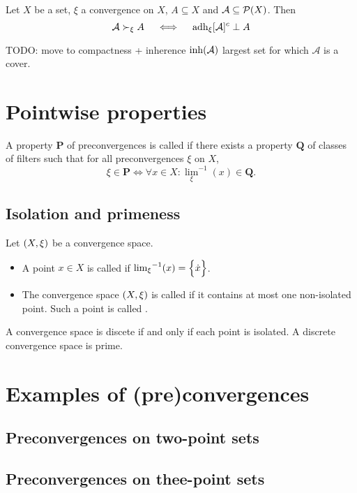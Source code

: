 \begin{proposition}
Let $X$ be a set, $\xi$ a convergence on $X$, $A\subseteq X$ and $\mathcal{A}\subseteq \operatorname{\mathcal{P}}(X)$. Then
\[ \mathcal{A} \succ_\xi A \quad\iff\quad \operatorname{adh}_\xi [\mathcal{A}]^c \perp A \]
\end{proposition}


TODO: move to compactness + inherence $\operatorname{inh}(\mathcal{A})$ largest set for which $\mathcal{A}$ is a cover.

\section{Pointwise properties}
\begin{definition}
A property $\mathbf{P}$ of preconvergences is called  if there exists a property $\mathbf{Q}$ of classes of filters such that for all preconvergences $\xi$ on $X$,
\[ \xi \in \mathbf{P} \iff \forall x\in X: {\lim_\xi}^{-1}(x) \in \mathbf{Q}. \]
\end{definition}

\subsection{Isolation and primeness}
\begin{definition}
Let $\left( X,\xi \right)$ be a convergence space.
\begin{itemize}
\item A point $x\in X$ is called  if ${\lim_\xi}^{-1}(x) = \Big\{ \dot{x} \Big\}$.
\item The convergence space $\left( X,\xi \right)$ is called  if it contains at most one non-isolated point. Such a point is called .
\end{itemize}
\end{definition}

A convergence space is discete if and only if each point is isolated. A discrete convergence space is prime.


\section{Examples of (pre)convergences}
\subsection{Preconvergences on two-point sets}
\subsection{Preconvergences on thee-point sets}


